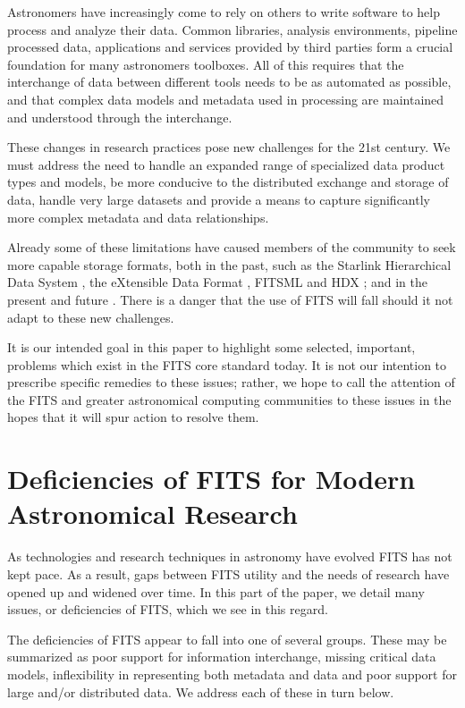 \documentclass[final,authoryear,5p,times,twocolumn]{elsarticle}
\begin{document}
Astronomers have increasingly come to rely on others to write software
to help process and analyze their data. Common libraries, analysis
environments, pipeline processed data, applications and services
provided by third parties form a crucial foundation for many
astronomers toolboxes. All of this requires that the interchange of
data between different tools needs to be as automated as possible, and
that complex data models and metadata used in processing are
maintained and understood through the interchange.


These changes in research practices pose new challenges for the 21st
century. We must address the need to handle an expanded range of
specialized data product types and models, be more conducive to the
distributed exchange and storage of data, handle very large datasets
and provide a means to capture significantly more complex metadata and
data relationships.


Already some of these limitations have caused members of the community
to seek more capable storage formats, both in the past, such as the
Starlink Hierarchical Data System \citep[HDS;][]{1982QJRAS..23..485D},
the eXtensible Data Format \citep[XDF;][]{2001ASPC..238..217S}, FITSML
\citep{2001ASPC..238..487T} and HDX \citep{2003ASPC..295..221G}; and
in the present and future
\citep[e.g.][]{2011ASPC..442...53A,P91_adassxxiii}. There is a danger
that the use of FITS will fall should it not adapt to these new
challenges.


It is our intended goal in this paper to highlight some selected,
important, problems which exist in the FITS core standard today. It is
not our intention to prescribe specific remedies to these issues;
rather, we hope to call the attention of the FITS and greater
astronomical computing communities to these issues in the hopes that
it will spur action to resolve them.


\section{Deficiencies of FITS for Modern Astronomical Research}


As technologies and research techniques in astronomy have evolved FITS
has not kept pace. As a result, gaps between FITS utility and the
needs of research have opened up and widened over time. In this part
of the paper, we detail many issues, or deficiencies of FITS, which we
see in this regard.


The deficiencies of FITS appear to fall into one of several
groups. These may be summarized as poor support for information
interchange, missing critical data models, inflexibility in
representing both metadata and data and poor support for large and/or
distributed data. We address each of these in turn below.
\end{document}
